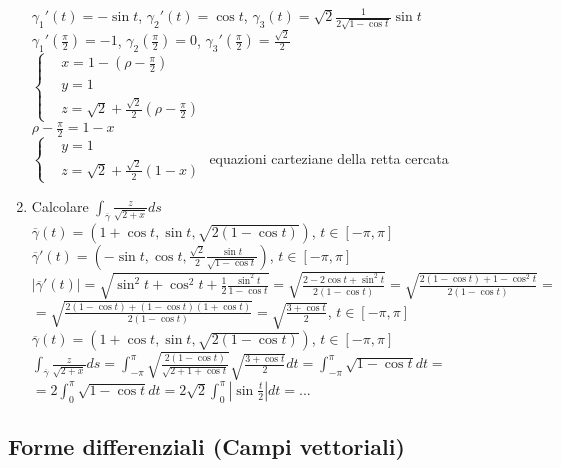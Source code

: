 \begin{exbar}
\begin{example}
\begin{enumerate}
		$\gamma_1'(t)=-\sin t$, $\gamma_2'(t)=\cos t$, $\gamma_3(t)=\sqrt{2} \frac{1}{2\sqrt{1-\cos t}}\sin t$\\
		$\gamma_1'\left(\frac{\pi}{2}\right)=-1$, $\gamma_2\left( \frac{\pi}{2}\right)=0$, $\gamma_3'\left( \frac{\pi}{2}\right)=\frac{\sqrt{2}}{2}$\\
		$\begin{cases}
			& x= 1-\left(\rho-\frac{\pi}{2}\right)\\
			& y= 1\\
			& z= \sqrt{2} +\frac{\sqrt{2}}{2}\left(\rho -\frac{\pi}{2}\right)
		\end{cases}$\\
		$\rho-\frac{\pi}{2}=1-x$\\
		$\begin{cases}
			& y=1\\
			& z= \sqrt{2} +\frac{\sqrt{2}}{2}(1-x)
		\end{cases}$
		equazioni carteziane della retta cercata
		\item Calcolare $\int_{\overline{\gamma}} \frac{z}{\sqrt{2+x}}ds$\\
		$\overline{\gamma}(t)=\left( 1+\cos t, \sin t, \sqrt{2(1-\cos t)} \right)$, $t \in [-\pi,\pi]$\\
		$\overline{\gamma}'(t)=\left( -\sin t , \cos t , \frac{\sqrt{2}}{2}\frac{\sin t }{\sqrt{1-\cos t}}\right)$, $t \in [-\pi,\pi]$\\
		$|\overline{\gamma}'(t)|=\sqrt{\sin^2t+\cos^2t+\frac{1}{2}\frac{\sin^2 t}{1-\cos t}}=\sqrt{\frac{2-2\cos t + \sin^2 t}{2(1-\cos t)}}=\sqrt{\frac{2(1-\cos t)+1-\cos^2t}{2(1-\cos t)}}=$\\$=\sqrt{\frac{2(1-\cos t)+ (1-\cos t)(1+\cos t)}{2(1-\cos t)}}=\sqrt{\frac{3+\cos t}{2}}$, $ t \in [-\pi,\pi]$\\
		$\overline{\gamma}(t)=\left(1+\cos t, \sin t , \sqrt{2(1-\cos t)}\right)$, $t \in [-\pi,\pi]$\\
		$\int_{\overline{\gamma}} \frac{z}{\sqrt{2+x}}ds=\int_{-\pi}^\pi \sqrt{\frac{2(1-\cos t)}{\sqrt{2+1+\cos t}}}\sqrt{\frac{3+\cos t}{2}}dt= \int_{-\pi}^\pi \sqrt{1-\cos t}dt=$\\
		$=2 \int_0^\pi \sqrt{1-\cos t}dt= 2 \sqrt{2}\int_0^\pi|\sin \frac{t}{2}|dt=...$
	\end{enumerate}
\end{example}
\end{exbar}


\subsection{Forme differenziali (Campi vettoriali)}
	
